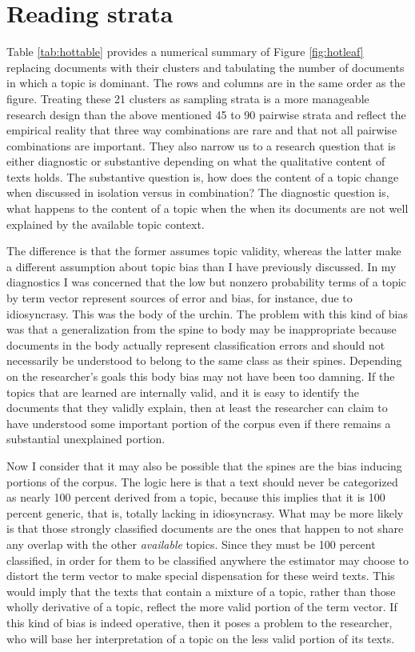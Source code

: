 \documentclass[]{book}
\theoremstyle{definition}
\theoremstyle{definition}
\theoremstyle{definition}
\theoremstyle{remark}
\begin{document}
\hypertarget{reading-strata}{%
\section{Reading strata}\label{reading-strata}}

Table \ref{tab:hottable} provides a numerical summary of Figure
\ref{fig:hotleaf} replacing documents with their clusters and tabulating
the number of documents in which a topic is dominant. The rows and
columns are in the same order as the figure. Treating these 21 clusters
as sampling strata is a more manageable research design than the above
mentioned 45 to 90 pairwise strata and reflect the empirical reality
that three way combinations are rare and that not all pairwise
combinations are important. They also narrow us to a research question
that is either diagnostic or substantive depending on what the
qualitative content of texts holds. The substantive question is, how
does the content of a topic change when discussed in isolation versus in
combination? The diagnostic question is, what happens to the content of
a topic when the when its documents are not well explained by the
available topic context.

The difference is that the former assumes topic validity, whereas the
latter make a different assumption about topic bias than I have
previously discussed. In my diagnostics I was concerned that the low but
nonzero probability terms of a topic by term vector represent sources of
error and bias, for instance, due to idiosyncrasy. This was the body of
the urchin. The problem with this kind of bias was that a generalization
from the spine to body may be inappropriate because documents in the
body actually represent classification errors and should not necessarily
be understood to belong to the same class as their spines. Depending on
the researcher's goals this body bias may not have been too damning. If
the topics that are learned are internally valid, and it is easy to
identify the documents that they validly explain, then at least the
researcher can claim to have understood some important portion of the
corpus even if there remains a substantial unexplained portion.

Now I consider that it may also be possible that the spines are the bias
inducing portions of the corpus. The logic here is that a text should
never be categorized as nearly 100 percent derived from a topic, because
this implies that it is 100 percent generic, that is, totally lacking in
idiosyncrasy. What may be more likely is that those strongly classified
documents are the ones that happen to not share any overlap with the
other \emph{available} topics. Since they must be 100 percent
classified, in order for them to be classified anywhere the estimator
may choose to distort the term vector to make special dispensation for
these weird texts. This would imply that the texts that contain a
mixture of a topic, rather than those wholly derivative of a topic,
reflect the more valid portion of the term vector. If this kind of bias
is indeed operative, then it poses a problem to the researcher, who will
base her interpretation of a topic on the less valid portion of its
texts.
\end{document}
